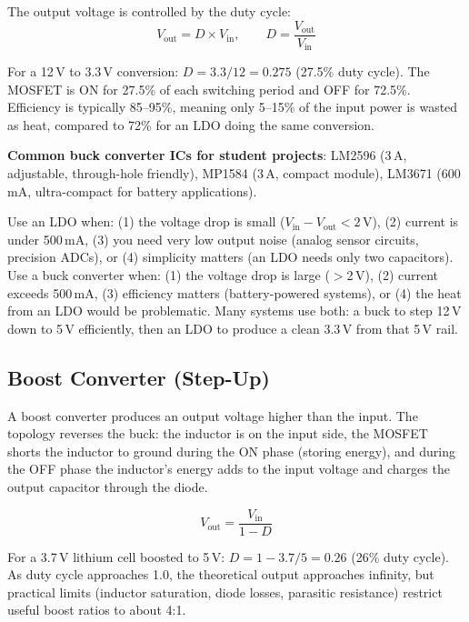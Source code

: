 \documentclass[11pt,letterpaper,twoside,openany]{book}
\begin{document}
The output voltage is controlled by the duty cycle:
\begin{equation}
V_{\text{out}} = D \times V_{\text{in}}, \qquad D = \frac{V_{\text{out}}}{V_{\text{in}}}
\end{equation}

For a 12\,V to 3.3\,V conversion: $D = 3.3/12 = 0.275$ (27.5\% duty cycle). The MOSFET is ON for 27.5\% of each switching period and OFF for 72.5\%. Efficiency is typically 85--95\%, meaning only 5--15\% of the input power is wasted as heat, compared to 72\% for an LDO doing the same conversion.

\textbf{Common buck converter ICs for student projects}: LM2596 (3\,A, adjustable, through-hole friendly), MP1584 (3\,A, compact module), LM3671 (600\,mA, ultra-compact for battery applications).

\begin{tipbox}
Use an LDO when: (1) the voltage drop is small ($V_{\text{in}} - V_{\text{out}} < 2$\,V), (2) current is under 500\,mA, (3) you need very low output noise (analog sensor circuits, precision ADCs), or (4) simplicity matters (an LDO needs only two capacitors). Use a buck converter when: (1) the voltage drop is large ($>$2\,V), (2) current exceeds 500\,mA, (3) efficiency matters (battery-powered systems), or (4) the heat from an LDO would be problematic. Many systems use both: a buck to step 12\,V down to 5\,V efficiently, then an LDO to produce a clean 3.3\,V from that 5\,V rail.
\end{tipbox}

\subsection{Boost Converter (Step-Up)}
A boost converter produces an output voltage higher than the input. The topology reverses the buck: the inductor is on the input side, the MOSFET shorts the inductor to ground during the ON phase (storing energy), and during the OFF phase the inductor's energy adds to the input voltage and charges the output capacitor through the diode.

\begin{equation}
V_{\text{out}} = \frac{V_{\text{in}}}{1 - D}
\end{equation}

For a 3.7\,V lithium cell boosted to 5\,V: $D = 1 - 3.7/5 = 0.26$ (26\% duty cycle). As duty cycle approaches 1.0, the theoretical output approaches infinity, but practical limits (inductor saturation, diode losses, parasitic resistance) restrict useful boost ratios to about 4:1.
\end{document}
